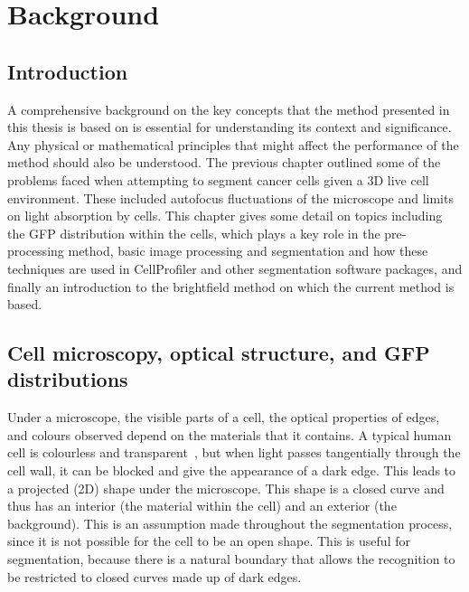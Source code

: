 
\chapter{Background}

\ifpdf
    \graphicspath{{Chapter3/Figs/Raster/}{Chapter3/Figs/PDF/}{Chapter3/Figs/}}
\else
    \graphicspath{{Chapter3/Figs/Vector/}{Chapter3/Figs/}}
\fi

\section{Introduction}

A comprehensive background on the key concepts that the method presented in this thesis is based on is essential for understanding its context and significance. Any physical or mathematical principles that might affect the performance of the method should also be understood. The previous chapter outlined some of the problems faced when attempting to segment cancer cells given a 3D live cell environment. These included autofocus fluctuations of the microscope and limits on light absorption by cells. This chapter gives some detail on topics including the GFP distribution within the cells, which plays a key role in the pre-processing method, basic image processing and segmentation and how these techniques are used in CellProfiler and other segmentation software packages, and finally an introduction to the brightfield method on which the current method is based.

\section{Cell microscopy, optical structure, and GFP distributions}

Under a microscope, the visible parts of a cell, the optical properties of edges, and colours observed depend on the materials that it contains. A typical human cell is colourless and transparent~\cite{Peters:90}, but when light passes tangentially through the cell wall, it can be blocked and give the appearance of a dark edge. This leads to a projected (2D) shape under the microscope. This shape is a closed curve and thus has an interior (the material within the cell) and an exterior (the background). This is an assumption made throughout the segmentation process, since it is not possible for the cell to be an open shape. This is useful for segmentation, because there is a natural boundary that allows the recognition to be restricted to closed curves made up of dark edges.

